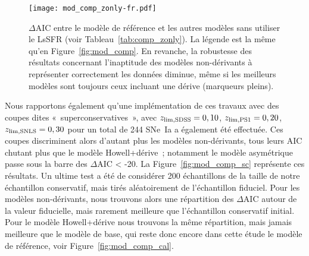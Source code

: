 \documentclass[../main/main.tex]{subfiles}
\begin{document}
\begin{SCfigure}[0.8][h!]
    \texttt{[image: mod\_comp\_zonly-fr.pdf]}
    \caption[$\Delta$AIC entre le modèle de base et les autres modèles sans
    utiliser le LsSFR]{$\Delta$AIC entre le modèle de référence et les autres
        modèles sans utiliser le LsSFR (voir Tableau~\ref{tab:comp_zonly}). La
        légende est la même qu'en Figure~\ref{fig:mod_comp}. En revanche, la
        robustesse des résultats concernant l'inaptitude des modèles
        non-dérivants à représenter correctement les données diminue, même si
        les meilleurs modèles sont toujours ceux incluant une dérive (marqueurs
    pleins).}\label{fig:mod_comp_zonly}
\end{SCfigure}

Nous rapportons également qu'une implémentation de ces travaux avec des coupes
dites «~superconservatives~», avec $z_{\rm lim, SDSS} = 0,10$, $z_{\rm lim, PS1}
= 0,20$, $z_{\rm lim, SNLS} = 0,30$ pour un total de 244 SNe~Ia a également été
effectuée. Ces coupes discriminent alors d'autant plus les modèles
non-dérivants, tous leurs AIC chutant plus que le modèle Howell+dérive~;
notamment le modèle asymétrique passe sous la barre des $\Delta$AIC < -20. La
Figure~\ref{fig:mod_comp_sc} représente ces résultats. Un ultime test a été de
considérer 200 échantillons de la taille de notre échantillon conservatif, mais
tirés aléatoirement de l'échantillon fiduciel. Pour les modèles non-dérivants,
nous trouvons alors une répartition des $\Delta$AIC autour de la valeur fiducielle,
mais rarement meilleure que l'échantillon conservatif initial. Pour le modèle
Howell+dérive nous trouvons la même répartition, mais jamais meilleure que le
modèle de base, qui reste donc encore dans cette étude le modèle de référence,
voir Figure~\ref{fig:mod_comp_cal}.
\end{document}
